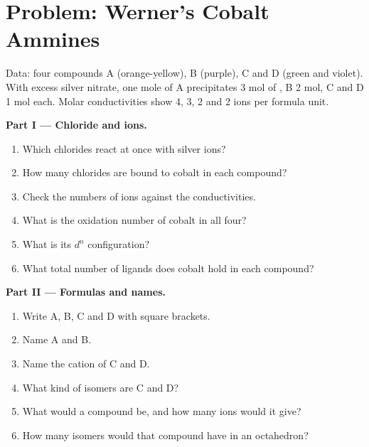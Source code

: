 \section{Problem: Werner's Cobalt Ammines}

\begin{problem}
\label{pb:b2:coordination-complexes:1}
Data: four compounds A  (orange-yellow), B 
(purple), C and D  (green and violet). With excess silver nitrate,
one mole of A precipitates 3 mol of , B 2 mol, C and D 1 mol each. Molar
conductivities show 4, 3, 2 and 2 ions per formula unit.

\medskip
\noindent\textbf{Part I --- Chloride and ions.}
\begin{enumerate}
  \item Which chlorides react at once with silver ions?
  \item How many chlorides are bound to cobalt in each compound?
  \item Check the numbers of ions against the conductivities.
  \item What is the oxidation number of cobalt in all four?
  \item What is its $d^n$ configuration?
  \item What total number of ligands does cobalt hold in each compound?
\end{enumerate}

\medskip
\noindent\textbf{Part II --- Formulas and names.}
\begin{enumerate}[resume]
  \item Write A, B, C and D with square brackets.
  \item Name A and B.
  \item Name the cation of C and D.
  \item What kind of isomers are C and D?
  \item What would a compound  be, and how many ions would it give?
  \item How many isomers would that compound have in an octahedron?
\end{enumerate}


\end{problem}
